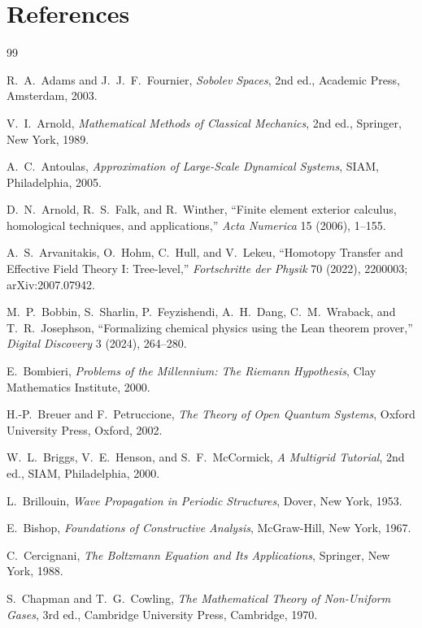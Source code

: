 \section*{References}

\begin{thebibliography}{99}

R.~A.~Adams and J.~J.~F.~Fournier,
\emph{Sobolev Spaces},
2nd ed., Academic Press, Amsterdam, 2003.

V.~I.~Arnold,
\emph{Mathematical Methods of Classical Mechanics},
2nd ed., Springer, New York, 1989.

A.~C.~Antoulas,
\emph{Approximation of Large-Scale Dynamical Systems},
SIAM, Philadelphia, 2005.

D.~N.~Arnold, R.~S.~Falk, and R.~Winther,
``Finite element exterior calculus, homological techniques, and applications,''
\emph{Acta Numerica} 15 (2006), 1--155.

A.~S.~Arvanitakis, O.~Hohm, C.~Hull, and V.~Lekeu,
``Homotopy Transfer and Effective Field Theory I: Tree-level,''
\emph{Fortschritte der Physik} 70 (2022), 2200003; arXiv:2007.07942.

M.~P.~Bobbin, S.~Sharlin, P.~Feyzishendi, A.~H.~Dang, C.~M.~Wraback, and T.~R.~Josephson,
``Formalizing chemical physics using the Lean theorem prover,''
\emph{Digital Discovery} 3 (2024), 264--280.

E.~Bombieri,
\emph{Problems of the Millennium: The Riemann Hypothesis},
Clay Mathematics Institute, 2000.

H.-P.~Breuer and F.~Petruccione,
\emph{The Theory of Open Quantum Systems},
Oxford University Press, Oxford, 2002.

W.~L.~Briggs, V.~E.~Henson, and S.~F.~McCormick,
\emph{A Multigrid Tutorial},
2nd ed., SIAM, Philadelphia, 2000.

L.~Brillouin,
\emph{Wave Propagation in Periodic Structures},
Dover, New York, 1953.

E.~Bishop,
\emph{Foundations of Constructive Analysis},
McGraw-Hill, New York, 1967.

C.~Cercignani,
\emph{The Boltzmann Equation and Its Applications},
Springer, New York, 1988.

S.~Chapman and T.~G.~Cowling,
\emph{The Mathematical Theory of Non-Uniform Gases},
3rd ed., Cambridge University Press, Cambridge, 1970.


\end{thebibliography}
